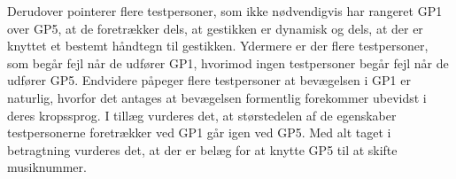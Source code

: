 Derudover pointerer flere testpersoner, som ikke nødvendigvis har rangeret GP1 over GP5, at de foretrækker dels, at gestikken er dynamisk og dels, at der er knyttet et bestemt håndtegn til gestikken. Ydermere er der flere testpersoner, som begår fejl når de udfører GP1, hvorimod ingen testpersoner begår fejl når de udfører GP5. Endvidere påpeger flere testpersoner at bevægelsen i GP1 er naturlig, hvorfor det antages at bevægelsen formentlig forekommer ubevidst i deres kropssprog. I tillæg vurderes det, at størstedelen af de egenskaber testpersonerne foretrækker ved GP1 går igen ved GP5. Med alt taget i betragtning vurderes det, at der er belæg for at knytte GP5 til at skifte musiknummer.
